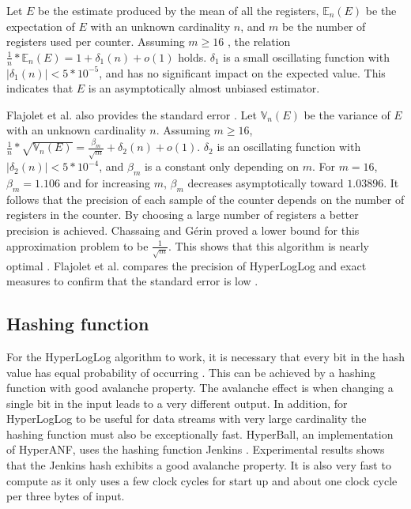 Let $E$ be the estimate produced by the mean of all the registers, $\mathbb{E}_n(E)$ be the expectation of $E$ with an unknown cardinality $n$, and $m$ be the number of registers used per counter. Assuming $m \geq 16$ , the relation $\frac{1}{n}*\mathbb{E}_n(E) = 1 + \delta_1(n) + o(1)$ holds. $\delta_1$ is a small oscillating function with $|\delta_1(n)| < 5*10^{-5}$, and has no significant impact on the expected value. This indicates that $E$ is an asymptotically almost unbiased estimator.

Flajolet et al. also provides the standard error \cite{hyperloglog}. Let $\mathbb{V}_n(E)$ be the variance of $E$ with an unknown cardinality $n$. Assuming $m \geq 16$,  $\frac{1}{n}*\sqrt{\mathbb{V}_n(E)} = \frac{\beta_m}{\sqrt{m}}  + \delta_2(n) + o(1)$. $\delta_2$ is an oscillating function with $|\delta_2(n)| < 5*10^{-4}$, and $\beta_m$ is a constant only depending on $m$. For $m = 16$, $\beta_m = 1.106$ and for increasing $m$, $\beta_m$ decreases asymptotically toward $1.03896$. It follows that the precision of each sample of the counter depends on the number of registers in the counter. By choosing a large number of registers a better precision is achieved. Chassaing and Gérin proved a lower bound for this approximation problem to be $\frac{1}{\sqrt{m}}$. This shows that this algorithm is nearly optimal \cite{nearopt}. Flajolet et al. compares the precision of HyperLogLog and exact measures to confirm that the standard error is low \cite{hyperloglog}.

\subsection{Hashing function}
For the HyperLogLog algorithm to work, it is necessary that every bit in the hash value has equal probability of occurring \cite{hyperloglog}. This can be achieved by a hashing function with good avalanche property. The avalanche effect is when changing a single bit in the input leads to a very different output. In addition, for HyperLogLog to be useful for data streams with very large cardinality the hashing function must also be exceptionally fast. HyperBall, an implementation of HyperANF, uses the hashing function Jenkins \cite{webgraph}. Experimental results shows that the Jenkins hash exhibits a good avalanche property. It is also very fast to compute as it only uses a few clock cycles for start up and about one clock cycle per three bytes of input.

\iffalse
\subsection{BroadWord}
Broadword is a way to do several calculations at the same time using cleverly constructed binary-logic expressions. HyperANF uses broadword to take the union $U$ of two HyperLogLog counters $A$ and $B$, which effectively is taking $\forall i; U_i = max(A_i,B_i)$
\fi

